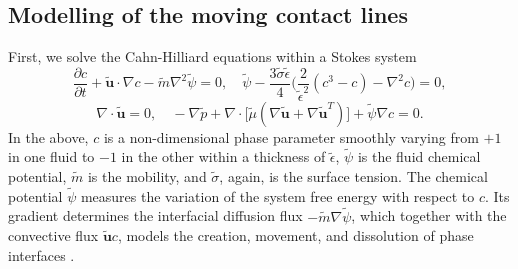 

\subsection{Modelling of the moving contact lines} \label{model}
%

 First, we solve the Cahn-Hilliard equations within a Stokes system
\begin{equation} \label{C-H}
  \frac{\partial c}{\partial t} + \tilde{{\bm u}}\cdot \nabla c -\tilde{m}\nabla ^2 \tilde{\psi}=0,
  \quad \tilde{\psi} - \frac{3\tilde{\sigma} \tilde{\epsilon}}{4} 
  \bigg(\frac{2}{\tilde{\epsilon}^2}(c^3-c) -\nabla ^2 c \bigg) =0,
\end{equation}
\begin{equation} \label{C-H Stokes}
    \nabla \cdot \tilde{{\bm u}} = 0, \quad
    -\nabla \tilde{p} + \nabla \cdot 
    \big[ \tilde{\mu} ( \nabla \tilde{{\bm u}} + \nabla \tilde{{\bm u}}^T ) \big] +\tilde{\psi}\nabla c = 0.
\end{equation}
In the above, $c$ is a non-dimensional phase parameter smoothly varying from $+1$ in one fluid to $-1$ in the other within a thickness of $\tilde{\epsilon}$, $\tilde{\psi}$ is the fluid chemical potential, $\tilde{m}$ is the mobility, and $\tilde{\sigma}$, again, is the surface tension. The chemical potential $\tilde{\psi}$ measures the variation of the system free energy with respect to $c$. Its gradient determines the interfacial diffusion flux $-\tilde{m}\nabla \tilde{\psi}$, which together with the convective flux $\tilde{{\bm u}} c$, models the creation, movement, and dissolution of phase interfaces \citep{Jacqmin2000}. %

